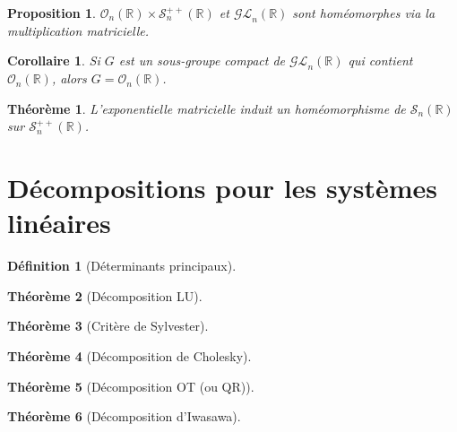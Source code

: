 \documentclass[french]{article}
\newcommand{\R}{\mathbb{R}}
\theoremstyle{plain}
\newtheorem{thm}{Théorème}
\newtheorem{prop}{Proposition}
\newtheorem{cor}{Corollaire}
\theoremstyle{definition}
\newtheorem{dfn}{Définition}
\begin{document}
\begin{prop}
	$\mathcal{O}_n(\R)\times\mathcal{S}_n^{++}(\R)$ et $\mathcal{GL}_n(\R)$ sont homéomorphes via la multiplication matricielle.
\end{prop}

\begin{cor}
	Si $G$ est un sous-groupe compact de $\mathcal{GL}_n(\R)$ qui contient $\mathcal{O}_n(\R)$, alors $G=\mathcal{O}_n(\R)$.
\end{cor}

\begin{thm}
	L'exponentielle matricielle induit un homéomorphisme de $\mathcal{S}_n(\R)$ sur $\mathcal{S}_n^{++}(\R)$.
\end{thm}

\section{Décompositions pour les systèmes linéaires}

\begin{dfn}[Déterminants principaux]
	
\end{dfn}

\begin{thm}[Décomposition LU]
	
\end{thm}

\begin{thm}[Critère de Sylvester]
	
\end{thm}

\begin{thm}[Décomposition de Cholesky]
	
\end{thm}

\begin{thm}[Décomposition OT (ou QR)]
	
\end{thm}

\begin{thm}[Décomposition d'Iwasawa]
	
\end{thm}
\end{document}
